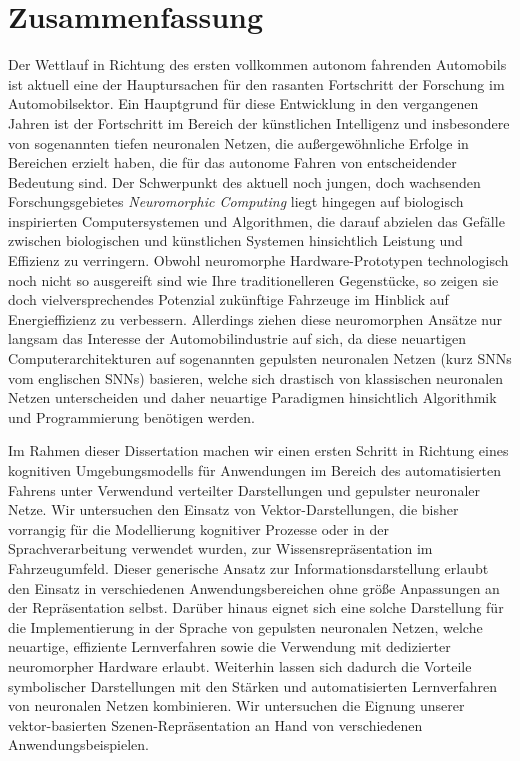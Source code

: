 \chapter*{Zusammenfassung}

Der Wettlauf in Richtung des ersten vollkommen autonom fahrenden Automobils ist aktuell eine der Hauptursachen f\"ur den rasanten Fortschritt der Forschung im Automobilsektor.
Ein Hauptgrund f\"ur diese Entwicklung in den vergangenen Jahren ist der Fortschritt im Bereich der k\"unstlichen Intelligenz und insbesondere von sogenannten tiefen neuronalen Netzen, die au{\ss}ergew\"ohnliche Erfolge in Bereichen erzielt haben, die f\"ur das autonome Fahren von entscheidender Bedeutung sind.
Der Schwerpunkt des aktuell noch jungen, doch wachsenden Forschungsgebietes \emph{Neuromorphic Computing} liegt hingegen auf biologisch inspirierten Computersystemen und Algorithmen, die darauf abzielen das Gef\"alle zwischen biologischen und k\"unstlichen Systemen hinsichtlich Leistung und Effizienz zu verringern.
Obwohl neuromorphe Hardware-Prototypen technologisch noch nicht so ausgereift sind wie Ihre traditionelleren Gegenst\"ucke, so zeigen sie doch vielversprechendes Potenzial zuk\"unftige Fahrzeuge im Hinblick auf Energieffizienz zu verbessern.
Allerdings ziehen diese neuromorphen Ans\"atze nur langsam das Interesse der Automobilindustrie auf sich, da diese neuartigen Computerarchitekturen auf sogenannten gepulsten neuronalen Netzen (kurz \acsp{SNN} vom englischen \aclp{SNN}) basieren, welche sich drastisch von klassischen neuronalen Netzen unterscheiden und daher neuartige Paradigmen hinsichtlich Algorithmik und Programmierung ben\"otigen werden.

Im Rahmen dieser Dissertation machen wir einen ersten Schritt in Richtung eines kognitiven Umgebungsmodells f\"ur Anwendungen im Bereich des automatisierten Fahrens unter Verwendund verteilter Darstellungen und gepulster neuronaler Netze.
Wir untersuchen den Einsatz von Vektor-Darstellungen, die bisher vorrangig f\"ur die Modellierung kognitiver Prozesse oder in der Sprachverarbeitung verwendet wurden, zur Wissensrepr\"asentation im Fahrzeugumfeld.
Dieser generische Ansatz zur Informationsdarstellung erlaubt den Einsatz in verschiedenen Anwendungsbereichen ohne gr\"o{\ss}e Anpassungen an der Repr\"asentation selbst.
Dar\"uber hinaus eignet sich eine solche Darstellung f\"ur die Implementierung in der Sprache von gepulsten neuronalen Netzen, welche neuartige, effiziente Lernverfahren sowie die Verwendung mit dedizierter neuromorpher Hardware erlaubt.
Weiterhin lassen sich dadurch die Vorteile symbolischer Darstellungen mit den St\"arken und automatisierten Lernverfahren von neuronalen Netzen kombinieren.
Wir untersuchen die Eignung unserer vektor-basierten Szenen-Repr\"asentation an Hand von verschiedenen Anwendungsbeispielen.

